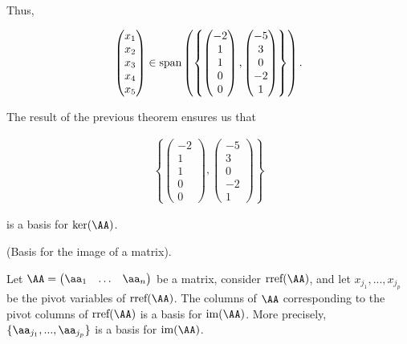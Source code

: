 \begin{example}
    Thus,

    \begin{align*}
        \begin{pmatrix}
            x_1 \\ x_2 \\ x_3 \\ x_4 \\ x_5
        \end{pmatrix}
        \in\text{span}\left(\left\{
        \begin{pmatrix}
            -2 \\ 1 \\ 1 \\ 0 \\ 0
        \end{pmatrix},
        \begin{pmatrix}
            -5 \\ 3 \\ 0 \\ -2 \\ 1
        \end{pmatrix}
        \right\}\right).
    \end{align*}

    The result of the previous theorem ensures us that

    \begin{align*}
        \left\{
        \begin{pmatrix}
            -2 \\ 1 \\ 1 \\ 0 \\ 0
        \end{pmatrix},
        \begin{pmatrix}
            -5 \\ 3 \\ 0 \\ -2 \\ 1
        \end{pmatrix}
        \right\}
    \end{align*}

    is a basis for $\ker(\AA)$. 
\end{example}

\begin{theorem}
    (Basis for the image of a matrix).

    Let $\AA = \begin{pmatrix} \aa_1 & \hdots & \aa_n \end{pmatrix}$ be a matrix, consider $\rref(\AA)$, and let $x_{j_1}, ..., x_{j_p}$ be the pivot variables of $\rref(\AA)$. The columns of $\AA$ corresponding to the pivot columns of $\rref(\AA)$ is a basis for $\im(\AA)$. More precisely, $\{\aa_{j_1}, ..., \aa_{j_p}\}$ is a basis for $\im(\AA)$.
\end{theorem}

